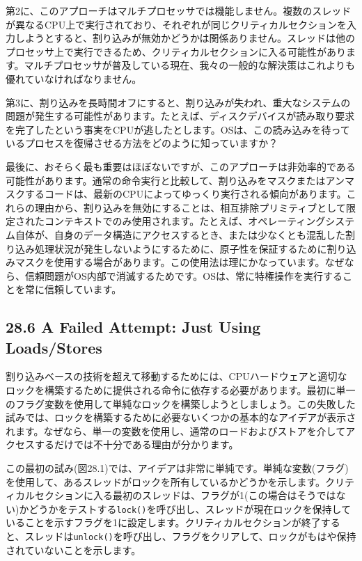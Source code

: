 第2に、このアプローチはマルチプロセッサでは機能しません。複数のスレッドが異なるCPU上で実行されており、それぞれが同じクリティカルセクションを入力しようとすると、割り込みが無効かどうかは関係ありません。スレッドは他のプロセッサ上で実行できるため、クリティカルセクションに入る可能性があります。マルチプロセッサが普及している現在、我々の一般的な解決策はこれよりも優れていなければなりません。

第3に、割り込みを長時間オフにすると、割り込みが失われ、重大なシステムの問題が発生する可能性があります。たとえば、ディスクデバイスが読み取り要求を完了したという事実をCPUが逃したとします。OSは、この読み込みを待っているプロセスを復帰させる方法をどのように知っていますか？

最後に、おそらく最も重要はほぼないですが、このアプローチは非効率的である可能性があります。通常の命令実行と比較して、割り込みをマスクまたはアンマスクするコードは、最新のCPUによってゆっくり実行される傾向があります。これらの理由から、割り込みを無効にすることは、相互排除プリミティブとして限定されたコンテキストでのみ使用されます。たとえば、オペレーティングシステム自体が、自身のデータ構造にアクセスするとき、または少なくとも混乱した割り込み処理状況が発生しないようにするために、原子性を保証するために割り込みマスクを使用する場合があります。この使用法は理にかなっています。なぜなら、信頼問題がOS内部で消滅するためです。OSは、常に特権操作を実行することを常に信頼しています。

\hypertarget{a-failed-attempt-just-using-loadsstores}{%
\subsection*{28.6 A Failed Attempt: Just Using
Loads/Stores}\label{a-failed-attempt-just-using-loadsstores}}

割り込みベースの技術を超えて移動するためには、CPUハードウェアと適切なロックを構築するために提供される命令に依存する必要があります。最初に単一のフラグ変数を使用して単純なロックを構築しようとしましょう。この失敗した試みでは、ロックを構築するために必要ないくつかの基本的なアイデアが表示されます。なぜなら、単一の変数を使用し、通常のロードおよびストアを介してアクセスするだけでは不十分である理由が分かります。

この最初の試み(図28.1)では、アイデアは非常に単純です。単純な変数(フラグ)を使用して、あるスレッドがロックを所有しているかどうかを示します。クリティカルセクションに入る最初のスレッドは、フラグが1(この場合はそうではない)かどうかをテストする\texttt{lock()}を呼び出し、スレッドが現在ロックを保持していることを示すフラグを1に設定します。クリティカルセクションが終了すると、スレッドは\texttt{unlock()}を呼び出し、フラグをクリアして、ロックがもはや保持されていないことを示します。

